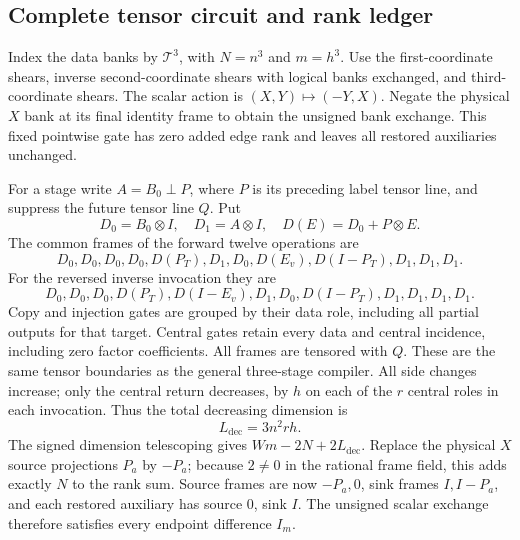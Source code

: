 \subsection{Complete tensor circuit and rank ledger}
Index the data banks by $\mathcal T^3$, with $N=n^3$ and $m=h^3$.
Use the first-coordinate shears, inverse second-coordinate shears with
logical banks exchanged, and third-coordinate shears. The scalar action
is $(X,Y)\mapsto(-Y,X)$. Negate the physical $X$ bank at its final identity
frame to obtain the unsigned bank exchange. This fixed pointwise gate
has zero added edge rank and leaves all restored auxiliaries unchanged.

For a stage write $A=B_0\mathbin\perp P$, where $P$ is its preceding
label tensor line, and suppress the future tensor line $Q$. Put
\[
 D_0=B_0\otimes I,\quad D_1=A\otimes I,\quad
 D(E)=D_0+P\otimes E.
\]
The common frames of the forward twelve operations are
\[
 D_0,D_0,D_0,D_0,D(P_T),D_1,D_0,D(E_v),D(I-P_T),D_1,D_1,D_1.
\]
For the reversed inverse invocation they are
\[
 D_0,D_0,D_0,D(P_T),D(I-E_v),D_1,D_0,D(I-P_T),D_1,D_1,D_1,D_1.
\]
Copy and injection gates are grouped by their data role, including all
partial outputs for that target. Central gates retain every data and
central incidence, including zero factor coefficients. All frames are
tensored with $Q$. These are the same tensor boundaries as the general
three-stage compiler. All side changes increase; only the central return
decreases, by $h$ on each of the $r$ central roles in each invocation.
Thus the total decreasing dimension is
\[
 L_{\mathrm{dec}}=3n^2rh.
\]
The signed dimension telescoping gives $Wm-2N+2L_{\mathrm{dec}}$.
Replace the physical $X$ source projections $P_a$ by $-P_a$; because
$2\ne0$ in the rational frame field, this adds exactly $N$ to the rank
sum. Source frames are now $-P_a,0$, sink frames $I,I-P_a$, and each
restored auxiliary has source $0$, sink $I$. The unsigned scalar exchange
therefore satisfies every endpoint difference $I_m$.

